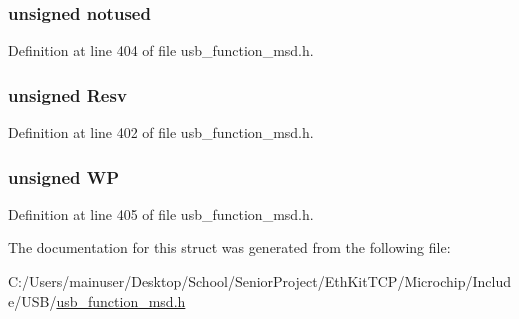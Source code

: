 \subsubsection[{notused}]{\setlength{\rightskip}{0pt plus 5cm}unsigned notused}\label{structt_mode_param_hdr_af096e8912c28affc9fddd1e352670b45}


Definition at line 404 of file usb\+\_\+function\+\_\+msd.\+h.

\hypertarget{structt_mode_param_hdr_a210ae04a3873a61568ab9e3a6595b20f}{}
\subsubsection[{Resv}]{\setlength{\rightskip}{0pt plus 5cm}unsigned Resv}\label{structt_mode_param_hdr_a210ae04a3873a61568ab9e3a6595b20f}


Definition at line 402 of file usb\+\_\+function\+\_\+msd.\+h.

\hypertarget{structt_mode_param_hdr_a8d2d25abedbe6cfe0f382c34cf387aa0}{}
\subsubsection[{W\+P}]{\setlength{\rightskip}{0pt plus 5cm}unsigned W\+P}\label{structt_mode_param_hdr_a8d2d25abedbe6cfe0f382c34cf387aa0}


Definition at line 405 of file usb\+\_\+function\+\_\+msd.\+h.



The documentation for this struct was generated from the following file\+:\begin{DoxyCompactItemize}
\item 
C\+:/\+Users/mainuser/\+Desktop/\+School/\+Senior\+Project/\+Eth\+Kit\+T\+C\+P/\+Microchip/\+Include/\+U\+S\+B/\hyperlink{usb__function__msd_8h}{usb\+\_\+function\+\_\+msd.\+h}\end{DoxyCompactItemize}
